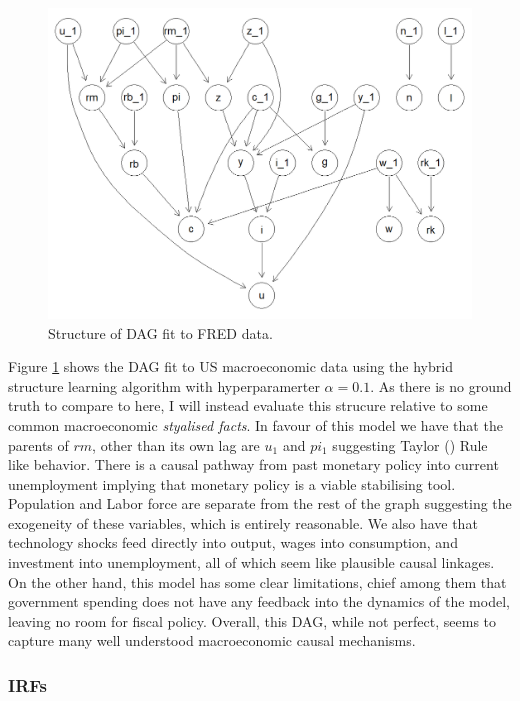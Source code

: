 \documentclass{article}
\begin{document}
\begin{figure}
  \centering
  \includegraphics[width=\linewidth]{images/real_hybrid_structure.png}
  \caption{Structure of DAG fit to FRED data.}
  \label{freddag}
\end{figure}

Figure \ref{freddag} shows the DAG fit to US macroeconomic data using the hybrid structure learning algorithm with hyperparamerter $\alpha = 0.1$. As there is no ground truth to compare to here, I will instead evaluate this strucure relative to some common macroeconomic \textit{styalised facts}. In favour of this model we have that the parents of $rm$, other than its own lag are $u_1$ and $pi_1$ suggesting Taylor (\citeyear{taylor1993discretion}) Rule like behavior. There is a causal pathway from past monetary policy into current unemployment implying that monetary policy is a viable stabilising tool. Population and Labor force are separate from the rest of the graph suggesting the exogeneity of these variables, which is entirely reasonable. We also have that technology shocks feed directly into output, wages into consumption, and investment into unemployment, all of which seem like plausible causal linkages. On the other hand, this model has some clear limitations, chief among them that government spending does not have any feedback into the dynamics of the model, leaving no room for fiscal policy. Overall, this DAG, while not perfect, seems to capture many well understood macroeconomic causal mechanisms.

\subsubsection{IRFs}
\end{document}
